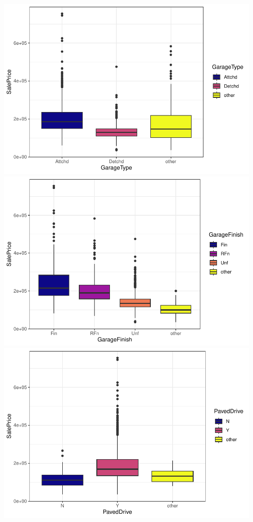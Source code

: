 \documentclass[
]{article}
\begin{document}
\includegraphics{report_files/figure-latex/categorical variables-28.pdf}
\includegraphics{report_files/figure-latex/categorical variables-29.pdf}
\includegraphics{report_files/figure-latex/categorical variables-30.pdf}
\end{document}
